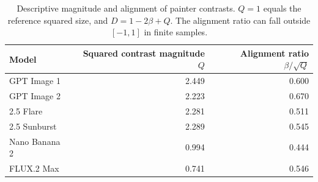 \begin{table}[htbp]\centering\small
\begin{tabular}{@{}lrr@{}}\toprule
Model & Squared contrast magnitude $Q$ & Alignment ratio $\beta/\sqrt Q$\\
\midrule
GPT Image 1 & 2.449 & 0.600\\
GPT Image 2 & 2.223 & 0.670\\
2.5 Flare & 2.281 & 0.511\\
2.5 Sunburst & 2.289 & 0.545\\
Nano Banana 2 & 0.994 & 0.444\\
FLUX.2 Max & 0.741 & 0.546\\
\bottomrule\end{tabular}
\caption{Descriptive magnitude and alignment of painter contrasts. $Q=1$ equals the reference squared size, and $D=1-2\beta+Q$. The alignment ratio can fall outside $[-1,1]$ in finite samples.}
\label{tab:review-alignment}\end{table}
